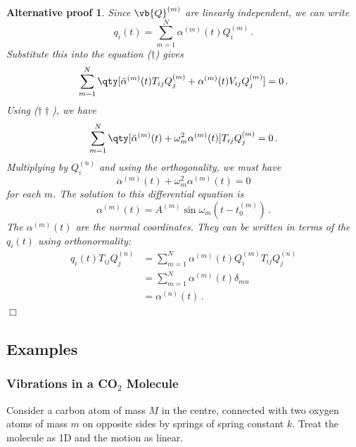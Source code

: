\documentclass{article}
\theoremstyle{plain}\theoremheaderfont{\normalfont\itshape}\theorembodyfont{\rmfamily}\theoremseparator{.}\newtheorem*{rem}{Remark}\newtheorem*{ex}{Example}\newtheorem*{proof}{Proof}\newtheorem*{altp}{Alternative proof}
\theoremstyle{plain}\theoremheaderfont{\normalfont\bfseries}\theorembodyfont{\rmfamily}\theoremseparator{.}\newtheorem{thm}{Theorem}[section]\newtheorem{lem}[thm]{Lemma}\newtheorem{prop}[thm]{Proposition}\newtheorem*{cor}{Corollary}\newtheorem{defn}[thm]{Definition}\newtheorem{clm}[thm]{Claim}\newtheorem{clminproof}{Claim}
\theoremstyle{break}\theoremheaderfont{\normalfont\itshape}\theorembodyfont{\rmfamily}\theoremseparator{.\medskip}\newtheorem*{proofskip}{Proof}\newtheorem*{exs}{Examples}\newtheorem*{rems}{Remarks}
\theoremstyle{break}\theoremheaderfont{\normalfont\bfseries}\theorembodyfont{\rmfamily}\theoremseparator{.\medskip}\newtheorem{lemskip}[thm]{Lemma}\newtheorem{defnskip}[thm]{Definition}\newtheorem{propskip}[thm]{Proposition}\newtheorem{thmskip}[thm]{Theorem}
\numberwithin{equation}{section}
\newcommand{\qed}{\hfill\ensuremath{\Box}}
\begin{document}
	\begin{altp}
		Since \(\vb{Q}^{(m)}\) are linearly independent, we can write
		\[q_i(t)=\sum_{m=1}^{N}\alpha^{(m)}(t)Q_i^{(m)}\,.\]
		Substitute this into the equation (\(\dagger\)) gives
		\[\sum_{m=1}^{N}\qty[\ddot{\alpha}^{(m)}(t)T_{ij}Q_j^{(m)}+\alpha^{(m)}(t)V_{ij}Q_j^{(m)}]=0\,.\]
		Using (\(\dagger\dagger\)), we have
		\[\sum_{m=1}^{N}\qty[\ddot{\alpha}^{(m)}(t)+\omega_m^2\alpha^{(m)}(t)]T_{ij}Q_j^{(m)}=0\,.\]
		Multiplying by \(Q_i^{(n)}\) and using the orthogonality, we must have
		\[\ddot{\alpha}^{(m)}(t)+\omega_m^2\alpha^{(m)}(t)=0\]
		for each \(m\). The solution to this differential equation is
		\[\alpha^{(m)}(t)=A^{(m)}\sin\omega_m(t-t_0^{(m)})\,.\]
		The \(\alpha^{(m)}(t)\) are the normal coordinates. They can be written in terms of the \(q_i(t)\) using orthonormality:
		\begin{align*}
			q_i(t)T_{ij}Q_j^{(n)}&=\sum_{m=1}^{N}\alpha^{(m)}(t)Q_i^{(m)}T_{ij}Q_j^{(n)}\\
			&=\sum_{m=1}^{N}\alpha^{(m)}(t)\delta_{mn}\\
			&=\alpha^{(n)}(t)\,.
		\end{align*}\qed
	\end{altp}

	\subsection{Examples}
	\subsubsection{Vibrations in a CO\(_2\) Molecule}
	Consider a carbon atom of mass \(M\) in the centre, connected with two oxygen atoms of mass \(m\) on opposite sides by springs of spring constant \(k\). Treat the molecule as 1D and the motion as linear.
\end{document}
